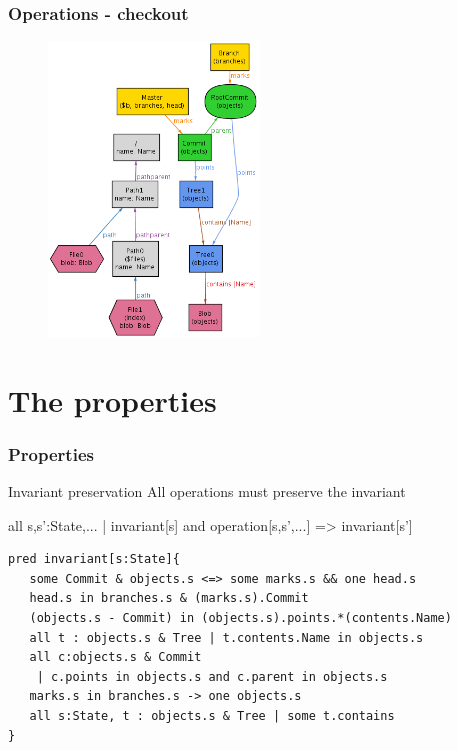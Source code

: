 \documentclass{beamer}
\begin{document}
\begin{frame}[fragile]
   \frametitle{Operations - checkout}
      \begin{figure}
         \centering
         \includegraphics[width=0.50\textwidth]{images/checkout2.png}
      \end{figure}
\end{frame}

\section{The properties}
\begin{frame}[fragile]
   \frametitle{Properties}
   \begin{block}{Invariant preservation}
      All operations must preserve the invariant
   \end{block}
   \vspace{0.1in}
all s,s':State,... | invariant[s] and operation[s,s',...] => invariant[s'] \\
   \vspace{0.3in}
   \scriptsize
   \begin{lstlisting}
pred invariant[s:State]{   
   some Commit & objects.s <=> some marks.s && one head.s
   head.s in branches.s & (marks.s).Commit
   (objects.s - Commit) in (objects.s).points.*(contents.Name)
   all t : objects.s & Tree | t.contents.Name in objects.s
   all c:objects.s & Commit 
   	| c.points in objects.s and c.parent in objects.s
   marks.s in branches.s -> one objects.s
   all s:State, t : objects.s & Tree | some t.contains
}
   \end{lstlisting}

\end{frame}
\end{document}
